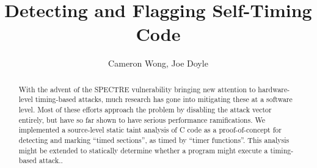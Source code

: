 \documentclass[12pt]{article}
\title{Detecting and Flagging Self-Timing Code}
\author{Cameron Wong, Joe Doyle}
\begin{document}
\maketitle

\begin{abstract}
  With the advent of the SPECTRE vulnerability bringing new attention to
  hardware-level timing-based attacks, much research has gone into mitigating
  these at a software level. Most of these efforts approach the problem by
  disabling the attack vector entirely, but have so far shown to have serious
  performance ramifications. We implemented a source-level static
  taint analysis of C code as a proof-of-concept for detecting and
  marking ``timed sections'', as timed by ``timer functions''. This
  analysis might  be extended to statically determine whether a
  program might execute a timing-based attack..
\end{abstract}
\end{document}
